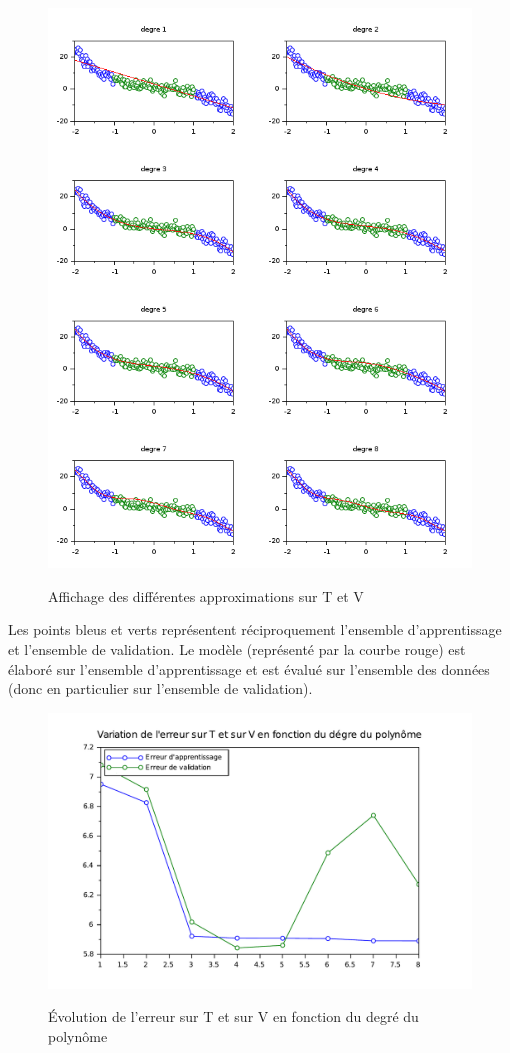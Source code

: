 \documentclass[a4paper,10pt]{report}
\begin{document}
\begin{figure}[H]
\centering
\caption{Affichage des différentes approximations sur T et V}
\includegraphics[width=\textwidth]{validation_poly.png}
\label{graph_validation_poly}
\end{figure}

Les points bleus et verts représentent réciproquement l'ensemble d'apprentissage et l'ensemble de validation. Le modèle (représenté par la courbe rouge) est élaboré sur l'ensemble d'apprentissage et est évalué sur l'ensemble des données (donc en particulier sur l'ensemble de validation).

\begin{figure}[H]
\centering
\caption{Évolution de l'erreur sur T et sur V en fonction du degré du polynôme}
\includegraphics[width=12cm]{erreur_validation.pdf}
\label{erreur_validation}
\end{figure}
\end{document}
